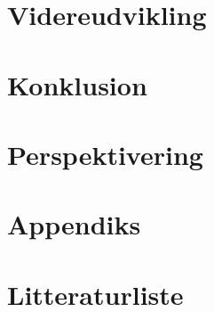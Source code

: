 \chapter{Videreudvikling}

\chapter{Konklusion}

\chapter{Perspektivering}

\chapter{Appendiks}



\chapter{Litteraturliste}

\newpage
\listoffigures
{}
\newpage
\listoftables
{}
\newpage
\printbibliography
\listoffixmes
